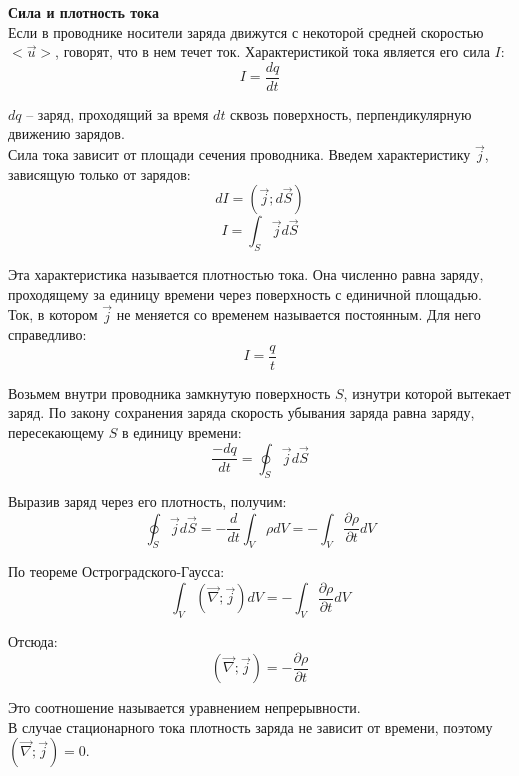 \documentclass{article}
\begin{document}
	
	\textbf{Сила и плотность тока}\\

	Если в проводнике носители заряда движутся с некоторой средней скоростью $<\vec u>$, говорят, что в нем течет ток. Характеристикой тока является его сила $I$:
	\begin{equation}
		I = \frac{dq}{dt}
	\end{equation}

	$dq$ -- заряд, проходящий за время $dt$ сквозь поверхность, перпендикулярную движению зарядов.\\

	Сила тока зависит от площади сечения проводника. Введем характеристику $\vec j$, зависящую только от зарядов:
	\begin{equation}
		dI = (\vec j;d\vec S)
	\end{equation}
	\begin{equation}
		I = \int_S \vec j d\vec S
	\end{equation}

	Эта характеристика называется плотностью тока. Она численно равна заряду, проходящему за единицу времени через поверхность с единичной площадью.\\

	Ток, в котором $\vec j$ не меняется со временем называется постоянным. Для него справедливо:
	\begin{equation}
		I = \frac{q}{t}
	\end{equation}

	Возьмем внутри проводника замкнутую поверхность $S$, изнутри которой вытекает заряд. По закону сохранения заряда скорость убывания заряда равна заряду, пересекающему $S$ в единицу времени:
	\begin{equation}
		\frac{-dq}{dt} = \oint_S \vec j d\vec S
	\end{equation}

	Выразив заряд через его плотность, получим:
	\begin{equation}
		\oint_S \vec j d\vec S = -\frac{d}{dt}\int_V \rho dV = -\int_V \frac{\partial \rho}{\partial t}dV
	\end{equation}

	По теореме Остроградского-Гаусса:
	\begin{equation}
		\int_V (\vec\nabla;\vec j)dV = -\int_V\frac{\partial\rho}{\partial t}dV
	\end{equation}

	Отсюда:
	\begin{equation}
		(\vec\nabla;\vec j) = -\frac{\partial\rho}{\partial t}
	\end{equation}

	Это соотношение называется уравнением непрерывности.\\

	В случае стационарного тока плотность заряда не зависит от времени, поэтому $(\vec\nabla;\vec j) = 0$.
\end{document}
